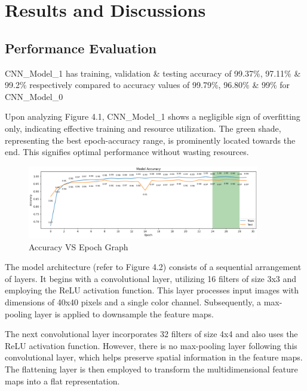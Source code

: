 \chapter{Results and Discussions}
\setcounter{equation}{0}

\section{Performance Evaluation}

CNN\_Model\_1 has training, validation \& testing accuracy of 99.37\%, 97.11\% \& 99.2\% respectively compared to accuracy values of 99.79\%, 96.80\% \& 99\% for CNN\_Model\_0

\noindent Upon analyzing Figure 4.1, CNN\_Model\_1 shows a negligible sign of overfitting only, indicating effective training and resource utilization. The green shade, representing the best epoch-accuracy range, is prominently located towards the end. This signifies optimal performance without wasting resources.

\begin{figure}[h!]
    \centering
    \includegraphics[width=0.9\textwidth]{Images/Perf_Eval/acc_vs_epoch.png}
    \caption{Accuracy VS Epoch Graph}
\end{figure}

\clearpage

\noindent The model architecture (refer to Figure 4.2) consists of a sequential arrangement of layers. It begins with a convolutional layer, utilizing 16 filters of size 3x3 and employing the ReLU activation function. This layer processes input images with dimensions of 40x40 pixels and a single color channel. Subsequently, a max-pooling layer is applied to downsample the feature maps.

\noindent The next convolutional layer incorporates 32 filters of size 4x4 and also uses the ReLU activation function. However, there is no max-pooling layer following this convolutional layer, which helps preserve spatial information in the feature maps. The flattening layer is then employed to transform the multidimensional feature maps into a flat representation.

